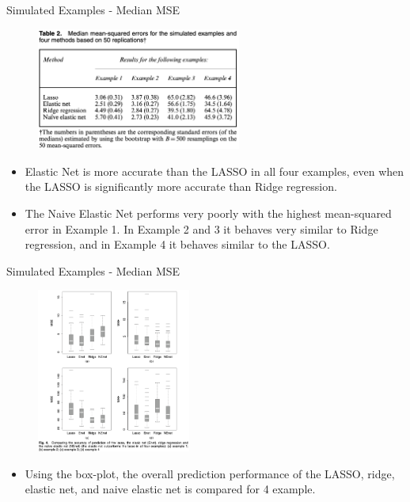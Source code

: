     \begin{frame}{Simulated Examples - Median MSE}
        \begin{figure}
            \centering
            \includegraphics[width=0.6\textwidth]{img/Table 2.png}
        \end{figure}
        \begin{itemize}
            \item Elastic Net is more accurate than the LASSO in all four examples, even when the LASSO is significantly more accurate than Ridge regression.
            \item The Naive Elastic Net performs very poorly with the highest mean-squared error in Example 1. In Example 2 and 3 it behaves very similar to Ridge regression, and in Example 4 it behaves similar to the LASSO.
        \end{itemize}
    \end{frame}

    \begin{frame}{Simulated Examples - Median MSE}
        \begin{figure}
            \centering
            \includegraphics[width=0.45\textwidth]{img/Fig 4.png}
        \end{figure}
        \begin{itemize}
            \item Using the box-plot, the overall prediction performance of the LASSO, ridge, elastic net, and naive elastic net is compared for 4 example.
        \end{itemize}
    \end{frame}


